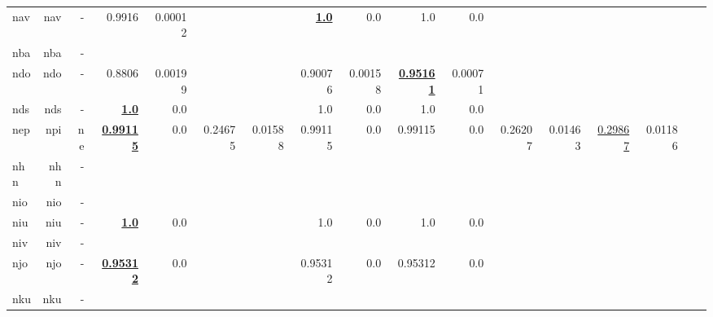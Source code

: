 \documentclass[11pt]{article}
\begin{document}
\begin{table*}[h]
{\begin{tabular}{lrrrrrrrrrrrrrrrr}
nav         & nav         & -         & 0.9916         & 0.00012         &          &          & \textbf{\underline{1.0}}         & 0.0         & 1.0         & 0.0         &          &          &          &          \\
nba         & nba         & -         &          &          &          &          &          &          &          &          &          &          &          &          \\
ndo         & ndo         & -         & 0.8806         & 0.00199         &          &          & 0.90076         & 0.00158         & \textbf{\underline{0.95161}}         & 0.00071         &          &          &          &          \\
nds         & nds         & -         & \textbf{\underline{1.0}}         & 0.0         &          &          & 1.0         & 0.0         & 1.0         & 0.0         &          &          &          &          \\
nep         & npi         & ne         & \textbf{\underline{0.99115}}         & 0.0         & 0.24675         & 0.01588         & 0.99115         & 0.0         & 0.99115         & 0.0         & 0.26207         & 0.01463         & \underline{0.29867}         & 0.01186         \\
nhn         & nhn         & -         &          &          &          &          &          &          &          &          &          &          &          &          \\
nio         & nio         & -         &          &          &          &          &          &          &          &          &          &          &          &          \\
niu         & niu         & -         & \textbf{\underline{1.0}}         & 0.0         &          &          & 1.0         & 0.0         & 1.0         & 0.0         &          &          &          &          \\
niv         & niv         & -         &          &          &          &          &          &          &          &          &          &          &          &          \\
njo         & njo         & -         & \textbf{\underline{0.95312}}         & 0.0         &          &          & 0.95312         & 0.0         & 0.95312         & 0.0         &          &          &          &          \\
nku         & nku         & -         &          &          &          &          &          &          &          &          &          &          &          &          \\

\end{tabular}}
\end{table*}
\end{document}
